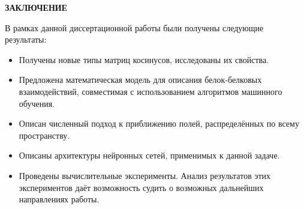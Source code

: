 \newpage
\begin{center}
	\textbf{\large ЗАКЛЮЧЕНИЕ}
\end{center}

В рамках данной диссертационной работы были получены следующие результаты:
\begin{itemize}
\item Получены новые типы матриц косинусов, исследованы их свойства.
\item Предложена математическая модель для описания белок-белковых взаимодействий, совместимая с использованием алгоритмов машинного обучения.
\item Описан численный подход к приближению полей, распределённых по всему пространству.
\item Описаны архитектуры нейронных сетей, применимых к данной задаче.
\item Проведены вычислительные эксперименты. Анализ результатов этих экспериментов даёт возможность судить о возможных дальнейших направлениях работы.
\end{itemize}
